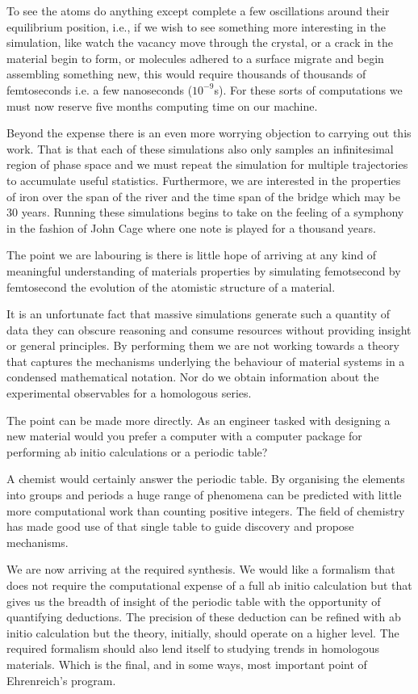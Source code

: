 To see the atoms do anything except complete a few oscillations around
their equilibrium position, i.e., if we wish to see something more interesting
in the simulation, like watch the vacancy
move through the crystal, or a crack in the material begin to form, or
molecules adhered to a surface migrate and begin assembling something new,
this would require thousands of thousands of femtoseconds i.e. a few nanoseconds ($10^{-9}$s).
For these sorts of computations we must now reserve five months computing time on our machine.

Beyond the expense there is an even more worrying objection to carrying out this work. That is that 
each of these simulations also only samples an infinitesimal region of phase space
and we must repeat the simulation for multiple trajectories to accumulate useful statistics.
Furthermore, we are interested in the properties of iron over the span of the river and the 
time span of the bridge which may be 30 years. Running these simulations begins to take on
the feeling of a symphony in the fashion of John Cage where one note is played for a thousand years.

The point we are labouring is there is little hope of arriving at any 
kind of meaningful understanding of materials properties by 
simulating femotsecond by femtosecond the evolution of the atomistic 
structure of a material.

It is an unfortunate fact that massive 
simulations generate such a quantity 
of data they can obscure reasoning and consume 
resources without providing insight or general principles. 
By performing them we are not working towards a theory that captures the mechanisms
underlying the behaviour of material systems in a condensed mathematical notation. Nor 
do we obtain information about the experimental 
observables for a homologous series.

The point can be made more directly. As an engineer tasked with designing a 
new material would you prefer a computer with a computer package for performing
ab initio calculations or a periodic table?

A chemist would certainly answer the periodic table. By organising the elements
into groups and periods a huge range 
of phenomena can be predicted with little more computational
work than counting positive integers.
The field of chemistry has made good use of that single table to guide
discovery and propose mechanisms.

We are now arriving at the required synthesis. We would like a 
formalism that does not require the computational expense of 
a full ab initio calculation but that gives us the breadth of insight
of the periodic table with the opportunity of quantifying deductions.
The precision of these deduction can be refined with ab initio calculation
but the theory, initially, should operate on a higher level.
The required formalism should also lend itself to 
studying trends in homologous materials.  
Which is the final, and in some ways, most important point of Ehrenreich's program.

